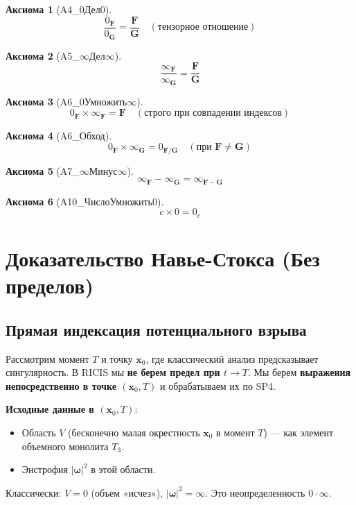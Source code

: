 \documentclass[12pt]{article}
\newtheorem{axiom}{Аксиома}
\newcommand{\0}{\mathbf{0}}
\newcommand{\1}{\mathds{1}}
\newcommand{\bomega}{\bm{\omega}}
\newcommand{\bx}{\mathbf{x}}
\newcommand{\bF}{\mathbf{F}}
\newcommand{\bG}{\mathbf{G}}
\begin{document}
\begin{axiom}[A4\_0Дел0]
\[
\frac{0_{\bF}}{0_{\bG}} = \frac{\bF}{\bG} \quad (\text{тензорное отношение})
\]
\end{axiom}

\begin{axiom}[A5\_$\infty$Дел$\infty$]
\[
\frac{\infty_{\bF}}{\infty_{\bG}} = \frac{\bF}{\bG}
\]
\end{axiom}

\begin{axiom}[A6\_0Умножить$\infty$]
\[
0_{\bF} \times \infty_{\bF} = \bF \quad (\text{строго при совпадении индексов})
\]
\end{axiom}

\begin{axiom}[A6\_Обход]
\[
0_{\bF} \times \infty_{\bG} = 0_{\bF/\bG} \quad (\text{при }\bF\neq\bG)
\]
\end{axiom}

\begin{axiom}[A7\_$\infty$Минус$\infty$]
\[
\infty_{\bF} - \infty_{\bG} = \infty_{\bF-\bG}
\]
\end{axiom}

\begin{axiom}[A10\_ЧислоУмножить0]
\[
c \times 0 = 0_c
\]
\end{axiom}

\section{Доказательство Навье-Стокса (Без пределов)}

\subsection{Прямая индексация потенциального взрыва}

Рассмотрим момент $T$ и точку $\bx_0$, где классический анализ предсказывает сингулярность. В RICIS мы \textbf{не берем предел при $t\to T$}. Мы берем \textbf{выражения непосредственно в точке $(\bx_0,T)$} и обрабатываем их по SP4.

\textbf{Исходные данные в $(\bx_0,T)$}:
\begin{itemize}
    \item Область $V$ (бесконечно малая окрестность $\bx_0$ в момент $T$) --- как элемент объемного монолита $T_3$.
    \item Энстрофия $|\bomega|^2$ в этой области.
\end{itemize}

Классически: $V = 0$ (объем «исчез»), $|\bomega|^2 = \infty$. Это неопределенность $0\cdot\infty$.
\end{document}
